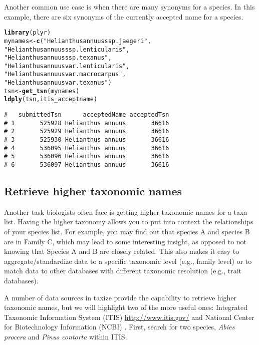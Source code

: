 \documentclass[10pt,a4paper,twocolumn]{article}\usepackage[]{graphicx}\usepackage[]{color}
\makeatletter
\newcommand{\hlstr}[1]{\textcolor[rgb]{0.192,0.494,0.8}{#1}}%
\newcommand{\hlstd}[1]{\textcolor[rgb]{0.345,0.345,0.345}{#1}}%
\newcommand{\hlkwb}[1]{\textcolor[rgb]{0.69,0.353,0.396}{#1}}%
\newcommand{\hlkwd}[1]{\textcolor[rgb]{0.737,0.353,0.396}{\textbf{#1}}}%
\newenvironment{kframe}{%
 \def\at@end@of@kframe{}%
 \ifinner\ifhmode%
  \def\at@end@of@kframe{\end{minipage}}%
  \begin{minipage}{\columnwidth}%
 \fi\fi%
 \def\FrameCommand##1{\hskip\@totalleftmargin \hskip-\fboxsep
 \colorbox{shadecolor}{##1}\hskip-\fboxsep
     \hskip-\linewidth \hskip-\@totalleftmargin \hskip\columnwidth}%
 \MakeFramed {\advance\hsize-\width
   \@totalleftmargin\z@ \linewidth\hsize
   \@setminipage}}%
 {\par\unskip\endMakeFramed%
 \at@end@of@kframe}
\newenvironment{knitrout}{}{} %
\makeatother
\begin{document}
Another common use case is when there are many synonyms for a species. In this example, there are six synonyms of the currently accepted name for a species. 

\begin{knitrout}\scriptsize
{}\color{fgcolor}\begin{kframe}
\begin{alltt}
\hlkwd{library}\hlstd{(plyr)}
\hlstd{mynames} \hlkwb{<-} \hlkwd{c}\hlstd{(}\hlstr{"Helianthus annuus ssp. jaegeri"}\hlstd{,}
             \hlstr{"Helianthus annuus ssp. lenticularis"}\hlstd{,}
             \hlstr{"Helianthus annuus ssp. texanus"}\hlstd{,}
             \hlstr{"Helianthus annuus var. lenticularis"}\hlstd{,}
             \hlstr{"Helianthus annuus var. macrocarpus"}\hlstd{,}
             \hlstr{"Helianthus annuus var. texanus"}\hlstd{)}
\hlstd{tsn} \hlkwb{<-} \hlkwd{get_tsn}\hlstd{(mynames)}
\hlkwd{ldply}\hlstd{(tsn, itis_acceptname)}
\end{alltt}
\begin{verbatim}
#   submittedTsn      acceptedName acceptedTsn
# 1       525928 Helianthus annuus       36616
# 2       525929 Helianthus annuus       36616
# 3       525930 Helianthus annuus       36616
# 4       536095 Helianthus annuus       36616
# 5       536096 Helianthus annuus       36616
# 6       536097 Helianthus annuus       36616
\end{verbatim}
\end{kframe}
\end{knitrout}



\subsection*{Retrieve higher taxonomic names}
Another task biologists often face is getting higher taxonomic names for a taxa list. Having the higher taxonomy allows you to put into context the relationships of your species list. For example, you may find out that species A and species B are in Family C, which may lead to some interesting insight, as opposed to not knowing that Species A and B are closely related. This also makes it easy to aggregate/standardize data to a specific taxonomic level (e.g., family level) or to match data to other databases with different taxonomic resolution (e.g., trait databases).

A number of data sources in taxize provide the capability to retrieve higher taxonomic names, but we will highlight two of the more useful ones: Integrated Taxonomic Information System (ITIS) \url{http://www.itis.gov/} and National Center for Biotechnology Information (NCBI) \cite{federhen2012}. First, search for two species, \emph{Abies procera} and \emph{Pinus contorta} within ITIS.
\end{document}

